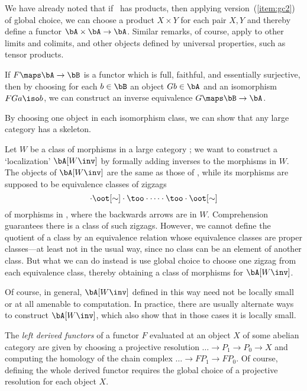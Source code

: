 \documentclass[12pt]{amsart}
\begin{document}
\begin{eg}
  We have already noted that if \bA\ has products, then applying
  version~(\ref{item:gc2}) of global choice, we can choose a product
  $X\times Y$ for each pair $X,Y$ and thereby define a functor
  $\bA\times\bA\to\bA$.  Similar remarks, of course, apply to other
  limits and colimits, and other objects defined by universal
  properties, such as tensor products.
\end{eg}

\begin{eg}
  If $F\maps \bA\to\bB$ is a functor which is full, faithful, and
  essentially surjective, then by choosing for each $b\in \bB$ an
  object $Gb\in\bA$ and an isomorphism $FGa\iso b$, we can construct
  an inverse equivalence $G\maps \bB\to\bA$.
\end{eg}

\begin{eg}
  By choosing one object in each isomorphism class, we can show that
  any large category has a skeleton.
\end{eg}

\begin{eg}
  Let $W$ be a class of morphisms in a large category \bA; we want to
  construct a `localization' $\bA[W\inv]$ by formally adding inverses
  to the morphisms in $W$.  The objects of $\bA[W\inv]$ are the same
  as those of \bA, while its morphisms are supposed to be equivalence
  classes of zigzags
  \[\cdot \oot[\sim] \cdot \too\cdot \cdots \cdot \too \cdot \oot[\sim]\]
  of morphisms in \bA, where the backwards arrows are in $W$.
  Comprehension guarantees there is a class of such zigzags.  However,
  we cannot define the quotient of a class by an equivalence relation
  whose equivalence classes are proper classes---at least not in the
  usual way, since no class can be an element of another class.  But
  what we can do instead is use global choice to choose one zigzag
  from each equivalence class, thereby obtaining a class of morphisms
  for $\bA[W\inv]$.

  Of course, in general, $\bA[W\inv]$ defined in this way need not be
  locally small or at all amenable to computation.  In practice, there
  are usually alternate ways to construct $\bA[W\inv]$, which also
  show that in those cases it is locally small.
\end{eg}

\begin{eg}
  The \emph{left derived functors} of a functor $F$ evaluated at an
  object $X$ of some abelian category are given by choosing a
  projective resolution $\dots\to P_1\to P_0 \to X$ and computing the
  homology of the chain complex $\dots\to FP_1\to FP_0$.  Of course,
  defining the whole derived functor requires the global choice of a
  projective resolution for each object $X$.
\end{eg}
\end{document}
